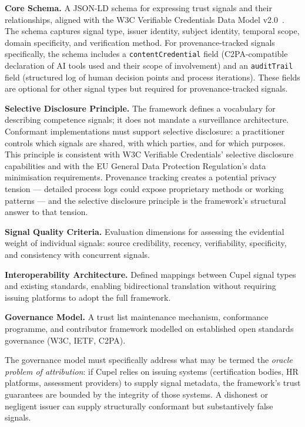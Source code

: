 \documentclass[11pt,a4paper]{article}
\begin{document}
\textbf{Core Schema.} A JSON-LD schema for expressing trust signals and their relationships,
aligned with the W3C Verifiable Credentials Data Model v2.0~\cite{w3cvc2022}. The schema
captures signal type, issuer identity, subject identity, temporal scope, domain specificity,
and verification method. For provenance-tracked signals specifically, the schema includes a
\texttt{contentCredential} field (C2PA-compatible declaration of AI tools used and their scope
of involvement) and an \texttt{auditTrail} field (structured log of human decision points and
process iterations). These fields are optional for other signal types but required for
provenance-tracked signals.

\textbf{Selective Disclosure Principle.} The framework defines a vocabulary for describing
competence signals; it does not mandate a surveillance architecture. Conformant implementations
must support selective disclosure: a practitioner controls which signals are shared, with which
parties, and for which purposes. This principle is consistent with W3C Verifiable Credentials'
selective disclosure capabilities and with the EU General Data Protection Regulation's data
minimisation requirements. Provenance tracking creates a potential privacy tension — detailed
process logs could expose proprietary methods or working patterns — and the selective disclosure
principle is the framework's structural answer to that tension.

\textbf{Signal Quality Criteria.} Evaluation dimensions for assessing the evidential weight of
individual signals: source credibility, recency, verifiability, specificity, and consistency
with concurrent signals.

\textbf{Interoperability Architecture.} Defined mappings between Cupel signal types and
existing standards, enabling bidirectional translation without requiring issuing platforms to
adopt the full framework.

\textbf{Governance Model.} A trust list maintenance mechanism, conformance programme, and
contributor framework modelled on established open standards governance (W3C, IETF, C2PA).

The governance model must specifically address what may be termed the \emph{oracle problem of
attribution}: if Cupel relies on issuing systems (certification bodies, HR platforms, assessment
providers) to supply signal metadata, the framework's trust guarantees are bounded by the
integrity of those systems. A dishonest or negligent issuer can supply structurally conformant
but substantively false signals.
\end{document}

